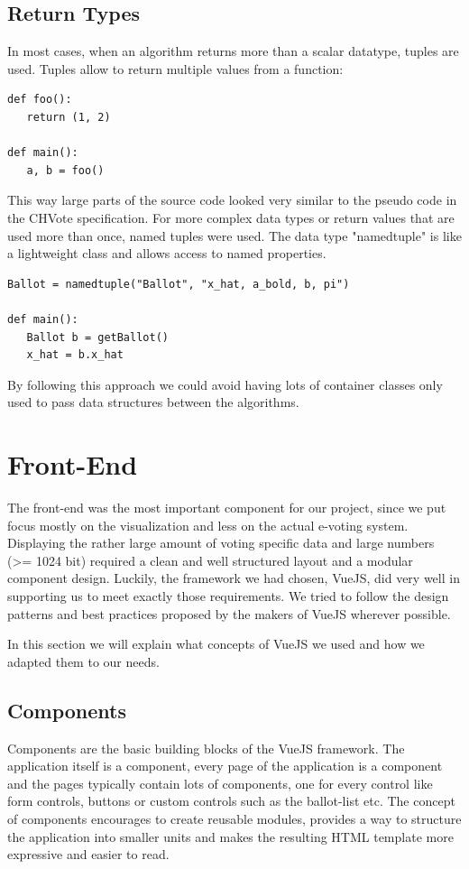 \subsection{Return Types}
In most cases, when an algorithm returns more than a scalar datatype, tuples are used. Tuples allow to return multiple values from a function:

\begin{verbatim}
def foo():
   return (1, 2)

def main():
   a, b = foo()
\end{verbatim}

This way large parts of the source code looked very similar to the pseudo code in the CHVote specification. For more complex data types or return values that are used more than once, named tuples were used. The data type "namedtuple" is like a lightweight class and allows access to named properties.

\begin{verbatim}
Ballot = namedtuple("Ballot", "x_hat, a_bold, b, pi")

def main():
   Ballot b = getBallot()
   x_hat = b.x_hat
\end{verbatim}

By following this approach we could avoid having lots of container classes only used to pass data structures between the algorithms.

\section{Front-End}
The front-end was the most important component for our project, since we put focus mostly on the visualization and less on the actual e-voting system. Displaying the rather large amount of voting specific data and large numbers (>= 1024 bit) required a clean and well structured layout and a modular component design. Luckily, the framework we had chosen, VueJS, did very well in supporting us to meet exactly those requirements. We tried to follow the design patterns and best practices proposed by the makers of VueJS wherever possible.

In this section we will explain what concepts of VueJS we used and how we adapted them to our needs.

\subsection{Components}
Components are the basic building blocks of the VueJS framework. The application itself is a component, every page of the application is a component and the pages typically contain lots of components, one for every control like form controls, buttons or custom controls such as the ballot-list etc. The concept of components encourages to create reusable modules, provides a way to structure the application into smaller units and makes the resulting HTML template more expressive and easier to read.

